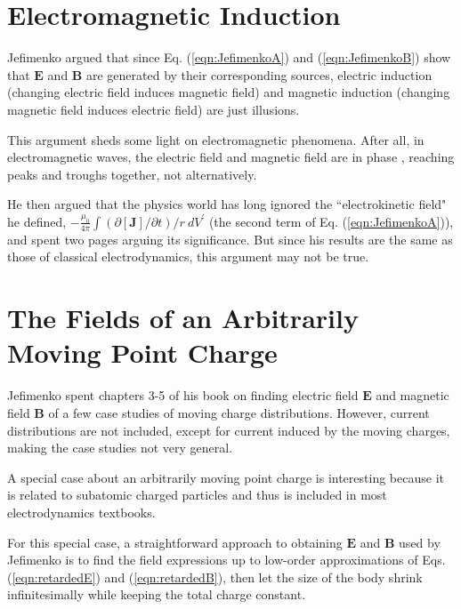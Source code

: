 \documentclass[11pt]{article}              %
\begin{document}
\section[Electromagnetic Induction]{Electromagnetic Induction
   }
Jefimenko argued that since Eq. (\ref{eqn:JefimenkoA}) and (\ref{eqn:JefimenkoB}) show that ${\mathbf E}$ and ${\mathbf B}$ are generated by their corresponding sources, electric induction (changing electric field induces magnetic field) and magnetic induction (changing magnetic field induces electric field) are just illusions.

This argument sheds some light on electromagnetic phenomena. After all, in electromagnetic waves, the electric field and magnetic field are in phase \cite{griffiths1999introduction}, reaching peaks and troughs together, not alternatively.

He then argued that the physics world has long ignored the ``electrokinetic field" he defined, $-\frac{\mu_0}{4\pi}\int (\partial [{\mathbf J}]/\partial t)/r\ dV^\prime$ (the second term of Eq. (\ref{eqn:JefimenkoA})), and spent two pages arguing its significance. But since his results are the same as those of classical electrodynamics, this argument may not be true.

\section{The Fields of an Arbitrarily Moving Point Charge}


Jefimenko spent chapters 3-5 of his book on finding electric field ${\mathbf E}$ and magnetic field ${\mathbf B}$ of a few case studies of moving charge distributions. However, current distributions are not included, except for current induced by the moving charges, making the case studies not very general. 

A special case about an arbitrarily moving point charge is interesting because it is related to subatomic charged particles and thus is included in most electrodynamics textbooks.

For this special case, a straightforward approach to obtaining $\mathbf{E}$ and $\mathbf{B}$ used by Jefimenko is to find the field expressions up to low-order approximations of Eqs. (\ref{eqn:retardedE}) and (\ref{eqn:retardedB}), then let the size of the body shrink infinitesimally while keeping the total charge constant. 
\end{document}
